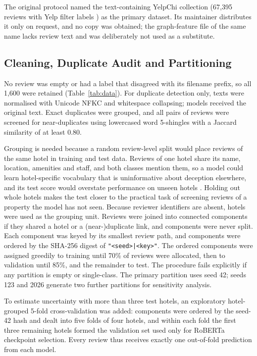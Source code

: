 The original protocol named the text-containing YelpChi collection (67,395 reviews with Yelp filter labels \cite{ref21,rayana2015}) as the primary dataset. Its maintainer distributes it only on request, and no copy was obtained; the graph-feature file of the same name lacks review text and was deliberately not used as a substitute.

\subsection{Cleaning, Duplicate Audit and Partitioning}
No review was empty or had a label that disagreed with its filename prefix, so all 1,600 were retained (Table~\ref{tab:data}). For duplicate detection only, texts were normalised with Unicode NFKC and whitespace collapsing; models received the original text. Exact duplicates were grouped, and all pairs of reviews were screened for near-duplicates using lowercased word 5-shingles with a Jaccard similarity of at least 0.80.

Grouping is needed because a random review-level split would place reviews of the same hotel in training and test data. Reviews of one hotel share its name, location, amenities and staff, and both classes mention them, so a model could learn hotel-specific vocabulary that is uninformative about deception elsewhere, and its test score would overstate performance on unseen hotels \cite{kapoor2023}. Holding out whole hotels makes the test closer to the practical task of screening reviews of a property the model has not seen. Because reviewer identifiers are absent, hotels were used as the grouping unit. Reviews were joined into connected components if they shared a hotel or a (near-)duplicate link, and components were never split. Each component was keyed by its smallest review path, and components were ordered by the SHA-256 digest of \texttt{"<seed>|<key>"}. The ordered components were assigned greedily to training until 70\% of reviews were allocated, then to validation until 85\%, and the remainder to test. The procedure fails explicitly if any partition is empty or single-class. The primary partition uses seed 42; seeds 123 and 2026 generate two further partitions for sensitivity analysis.

To estimate uncertainty with more than three test hotels, an exploratory hotel-grouped 5-fold cross-validation was added: components were ordered by the seed-42 hash and dealt into five folds of four hotels, and within each fold the first three remaining hotels formed the validation set used only for RoBERTa checkpoint selection. Every review thus receives exactly one out-of-fold prediction from each model.

